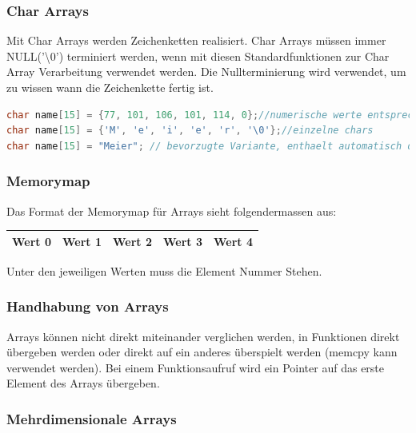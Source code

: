 \subsubsection{Char Arrays}

Mit Char Arrays werden Zeichenketten realisiert. Char Arrays müssen immer NULL('\textbackslash 0') terminiert werden, wenn mit diesen Standardfunktionen zur Char Array Verarbeitung verwendet werden. Die Nullterminierung wird verwendet, um zu wissen wann die Zeichenkette fertig ist.

\begin{lstlisting}[language = c]
char name[15] = {77, 101, 106, 101, 114, 0};//numerische werte entsprechen der Ascii definition
char name[15] = {'M', 'e', 'i', 'e', 'r', '\0'};//einzelne chars
char name[15] = "Meier"; // bevorzugte Variante, enthaelt automatisch das Nullzeichen!
\end{lstlisting}

\subsubsection{Memorymap}

Das Format der Memorymap für Arrays sieht folgendermassen aus:\newline

\begin{tabular}{|c|c|c|c|c|}
\hline
Wert 0&Wert 1& Wert 2& Wert 3&Wert 4\\ \hline
\end{tabular}

Unter den jeweiligen Werten muss die Element Nummer Stehen.

\subsubsection{Handhabung von Arrays}

Arrays können nicht direkt miteinander verglichen werden, in Funktionen direkt übergeben werden oder direkt auf ein anderes überspielt werden (memcpy kann verwendet werden).\newline
Bei einem Funktionsaufruf wird ein Pointer auf das erste Element des Arrays übergeben.

\subsubsection{Mehrdimensionale Arrays}

